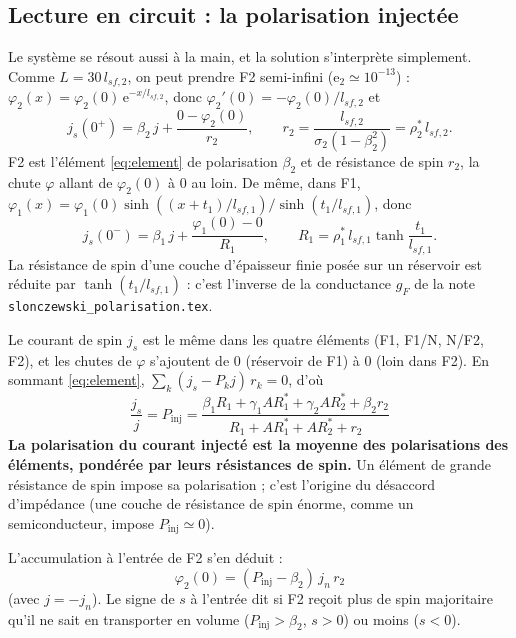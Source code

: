 \documentclass[11pt,a4paper]{article}
\newcommand{\ee}{\mathrm{e}}
\begin{document}
\subsection{Lecture en circuit : la polarisation injectée}
\label{sec:circuit}

Le système se résout aussi à la main, et la solution s'interprète
simplement. Comme $L = 30\,l_{sf,2}$, on peut prendre F2 semi-infini
($\ee_2 \simeq 10^{-13}$) : $\varphi_2(x) = \varphi_2(0)\,\ee^{-x/l_{sf,2}}$,
donc $\varphi_2'(0) = -\varphi_2(0)/l_{sf,2}$ et
\begin{equation}
  j_s(0^+) = \beta_2\,j + \frac{0-\varphi_2(0)}{r_2},
  \qquad r_2 = \frac{l_{sf,2}}{\sigma_2(1-\beta_2^2)} = \rho_2^*\,l_{sf,2} .
\end{equation}
F2 est l'élément \eqref{eq:element} de polarisation $\beta_2$ et de
résistance de spin $r_2$, la chute $\varphi$ allant de $\varphi_2(0)$ à
0 au loin. De même, dans F1, $\varphi_1(x) = \varphi_1(0)\sinh\left((x+t_1)/l_{sf,1}\right)/
\sinh(t_1/l_{sf,1})$, donc
\begin{equation}
  j_s(0^-) = \beta_1\,j + \frac{\varphi_1(0)-0}{R_1},
  \qquad R_1 = \rho_1^*\,l_{sf,1}\tanh\frac{t_1}{l_{sf,1}} .
\end{equation}
La résistance de spin d'une couche d'épaisseur finie posée sur un
réservoir est réduite par $\tanh(t_1/l_{sf,1})$ : c'est l'inverse de la
conductance $g_F$ de la note \texttt{slonczewski\_polarisation.tex}.

Le courant de spin $j_s$ est le même dans les quatre éléments (F1,
F1/N, N/F2, F2), et les chutes de $\varphi$ s'ajoutent de 0 (réservoir
de F1) à 0 (loin dans F2). En sommant \eqref{eq:element},
$\sum_k (j_s - P_kj)\,r_k = 0$, d'où
\begin{equation}
  \boxed{\;\frac{j_s}{j} = P_{\mathrm{inj}}
  = \frac{\beta_1R_1 + \gamma_1AR_1^* + \gamma_2AR_2^* + \beta_2r_2}
         {R_1 + AR_1^* + AR_2^* + r_2}\;}
  \label{eq:Pinj}
\end{equation}
\textbf{La polarisation du courant injecté est la moyenne des
polarisations des éléments, pondérée par leurs résistances de spin.} Un
élément de grande résistance de spin impose sa polarisation ; c'est
l'origine du désaccord d'impédance (une couche de résistance de spin
énorme, comme un semiconducteur, impose $P_{\mathrm{inj}}\simeq0$).

L'accumulation à l'entrée de F2 s'en déduit :
\begin{equation}
  \boxed{\;\varphi_2(0) = (P_{\mathrm{inj}}-\beta_2)\,j_n\,r_2\;}
  \label{eq:phi0}
\end{equation}
(avec $j = -j_n$). Le signe de $s$ à l'entrée dit si F2 reçoit plus de
spin majoritaire qu'il ne sait en transporter en volume
($P_{\mathrm{inj}} > \beta_2$, $s>0$) ou moins ($s<0$).
\end{document}
